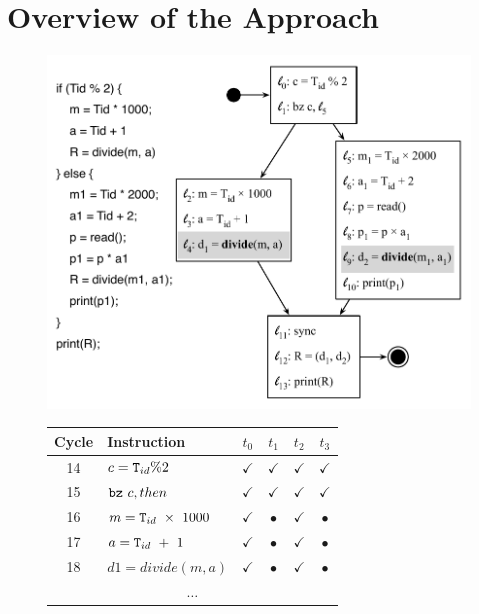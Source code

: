 \documentclass[times,10pt,twocolumn]{article}
\newcommand{\tid}{\mbox{\texttt{T}}_{id}}
\newcommand{\code}[1]{\mbox{\texttt{#1}}}
\begin{document}
\section{Overview of the Approach}
\label{sec:ovf}

\begin{figure}[b!]
\begin{center}

\includegraphics[width=1\columnwidth]{images/divide0} \\
\begin{small}
\begin{tabular}{|c|l|c|c|c|c|} \hline
Cycle   & Instruction                  & $t_0$        & $t_1$        & $t_2$        & $t_3$        \\ \hline
14      & $ c = \tid \% 2$             & $\checkmark$ & $\checkmark$ & $\checkmark$ & $\checkmark$ \\ \hline
15      & $ \code{bz} \ c, then$ & $\checkmark$ & $\checkmark$ & $\checkmark$ & $\checkmark$ \\ \hline
16      & $ m = \tid \ \times \ 1000$        & $\checkmark$    & $\bullet$ & $\checkmark$ & $\bullet$ \\ \hline
17      & $ a = \tid \ + \ 1$ & $\checkmark$    & $\bullet$ & $\checkmark$ & $\bullet$ \\ \hline
18      & $ d1 = divide(m, a)$ & $\checkmark$    & $\bullet$ & $\checkmark$ & $\bullet$ \\ \hline
\multicolumn{6}{c}{$\ldots$} \\ \hline

\end{tabular}
\end{small}
\end{center}
\end{figure}
\end{document}
